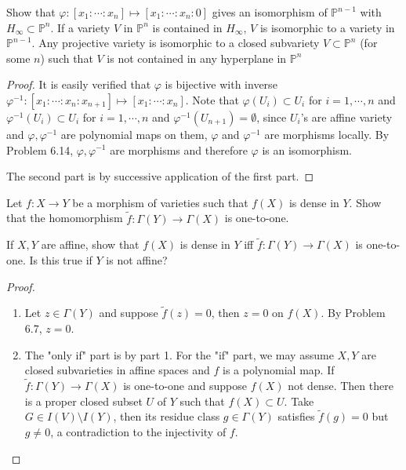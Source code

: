 \documentclass{solution}
\begin{document}
\begin{problem}{6.25}
    Show that $\varphi: [x_1: \cdots: x_n] \mapsto [x_1:\cdots:x_n:0]$ gives an isomorphism of $\mathbb{P}^{n - 1}$ with $H_{\infty} \subset \mathbb{P}^n$. If a variety $V$ in $\mathbb{P}^n$ is contained in $H_{\infty}$, $V$ is isomorphic to a variety in $\mathbb{P}^{n - 1}$. Any projective variety is isomorphic to a closed subvariety $V \subset \mathbb{P}^n$ (for some $n$) such that $V$ is not contained in any hyperplane in $\mathbb{P}^n$
\end{problem}

\begin{proof}
    It is easily verified that $\varphi$ is bijective with inverse $\varphi ^{-1}: [x_1: \cdots : x_n : x_{n + 1}] \mapsto [x_1:\cdots:x_n]$. Note that $\varphi(U_i) \subset U_i$ for $i = 1, \cdots, n$ and $\varphi ^{-1}(U_i) \subset U_i$ for $i = 1, \cdots, n$ and $\varphi ^{-1}(U_{n + 1}) = \emptyset$, since $U_i$'s are affine variety and $\varphi, \varphi ^{-1}$ are polynomial maps on them, $\varphi$ and $\varphi ^{-1}$ are morphisms locally. By Problem 6.14, $\varphi, \varphi ^{-1}$ are morphisms and therefore $\varphi$ is an isomorphism.

    The second part is by successive application of the first part.
\end{proof}

\begin{problem}{6.26}
    \begin{inparaenum}
        \item Let $f: X \rightarrow Y$ be a morphism of varieties such that $f(X)$ is dense in $Y$. Show that the homomorphism $\tilde{f}: \Gamma(Y) \rightarrow \Gamma(X)$ is one-to-one.
        \item If $X, Y$ are affine, show that $f(X)$ is dense in $Y$ iff $\tilde{f}: \Gamma(Y) \rightarrow \Gamma(X)$ is one-to-one. Is this true if $Y$ is not affine?
    \end{inparaenum}
\end{problem}

\begin{proof}
    \begin{enumerate}
        \item Let $z \in \Gamma(Y)$ and suppose $\tilde{f}(z) = 0$, then $z = 0$ on $f(X)$. By Problem 6.7, $z = 0$.
        \item The "only if" part is by part 1. For the "if" part, we may assume $X, Y$ are closed subvarieties in affine spaces and $f$ is a polynomial map. If $\tilde{f}: \Gamma(Y) \rightarrow \Gamma(X)$ is one-to-one and suppose $f(X)$ not dense. Then there is a proper closed subset $U$ of $Y$ such that $f(X) \subset U$. Take $G \in I(V) \setminus I(Y)$, then its residue class $g \in \Gamma(Y)$ satisfies $\tilde{f}(g) = 0$ but $g \ne 0$, a contradiction to the injectivity of $f$. \TODO
    \end{enumerate}
\end{proof}
\end{document}
